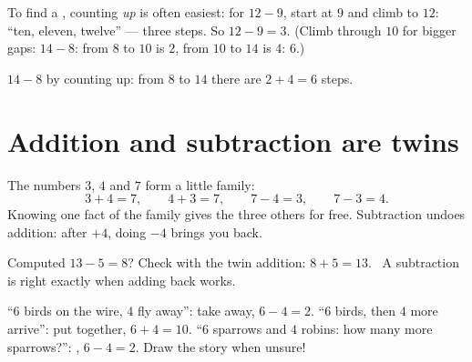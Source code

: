 \begin{method}[Counting up]\label{met:g1:subtraction:countup}
To find a , counting \emph{up} is often easiest:
for $12 - 9$, start at $9$ and climb to $12$: ``ten, eleven,
twelve'' --- three steps. So $12 - 9 = 3$. (Climb through $10$ for
bigger gaps: $14 - 8$: from $8$ to $10$ is $2$, from $10$ to $14$
is $4$:  $6$.)
\end{method}

\begin{omfigure}

{\small $14 - 8$ by counting up: from $8$ to $14$ there are
$2 + 4 = 6$ steps.}
\end{omfigure}

\section{Addition and subtraction are twins}

\begin{example}\label{ex:g1:subtraction:family}
The numbers $3$, $4$ and $7$ form a little family:
\[
3 + 4 = 7, \qquad
4 + 3 = 7, \qquad
7 - 4 = 3, \qquad
7 - 3 = 4 .
\]
Knowing one fact of the family gives the three others for free.
Subtraction undoes addition: after $+4$, doing $-4$ brings you back.
\end{example}

\begin{example}[Checking]\label{ex:g1:subtraction:check}
Computed $13 - 5 = 8$? Check with the twin addition:
$8 + 5 = 13$. \checkmark\ A subtraction is right exactly when adding
back works.
\end{example}

\begin{example}\label{ex:g1:subtraction:choose}
``$6$ birds on the wire, $4$ fly away'': take away, $6 - 4 = 2$.
``$6$ birds, then $4$ more arrive'': put together, $6 + 4 = 10$.
``$6$ sparrows and $4$ robins: how many more sparrows?'':
, $6 - 4 = 2$. Draw the story when unsure!
\end{example}

